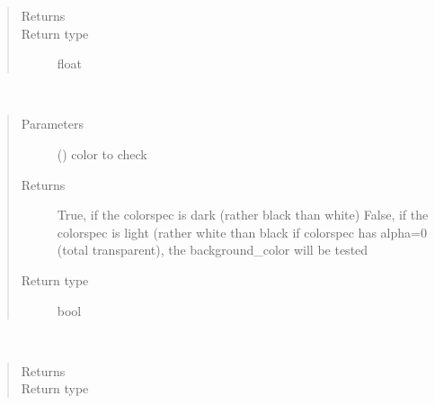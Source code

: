 \documentclass[letterpaper,10pt,english]{sphinxmanual}
\begin{document}
\begin{fulllineitems}
\begin{fulllineitems}
\begin{quote}
\begin{description}
\item[{Returns}] \leavevmode
{}

\item[{Return type}] \leavevmode
float

\end{description}\end{quote}

\end{fulllineitems}


\begin{fulllineitems}
\label{\detokenize{Reference:salabim.Environment.is_dark}}~\begin{quote}\begin{description}
\item[{Parameters}] \leavevmode
{} () \textendash{} color to check

\item[{Returns}] \leavevmode
True, if the colorspec is dark (rather black than white) 
False, if the colorspec is light (rather white than black 
if colorspec has alpha=0 (total transparent), the background\_color will be tested

\item[{Return type}] \leavevmode
bool

\end{description}\end{quote}

\end{fulllineitems}


\begin{fulllineitems}
\label{\detokenize{Reference:salabim.Environment.main}}~\begin{quote}\begin{description}
\item[{Returns}] \leavevmode
{}

\item[{Return type}] \leavevmode
{\hyperref[\detokenize{Reference:salabim.Component}]{}}


\end{description}
\end{quote}
\end{fulllineitems}
\end{fulllineitems}
\end{document}
